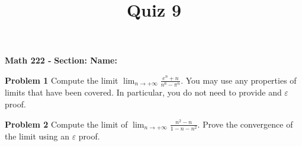 \documentclass{article}
\title{Quiz 9}
\begin{document}
\begin{center}\makeatletter %
{ \bf Math 222 - \@title }
{ \bf \hfill Section: \underline{\hspace{2cm}} \hfill Name: \underline{\hspace{5cm}} }
\end{center}

{\bf Problem 1} \quad Compute the limit $\displaystyle \lim_{n \to +\infty} \frac{e^n + n}{n^6 - \pi^n}$.
You may use any properties of limits that have been covered.  In particular, you do not need to provide
and $\varepsilon$ proof.\vfill

{\bf Problem 2} Compute the limit of $\displaystyle \lim_{n \to +\infty} \frac{n^2 - n}{1 - n - n^2}$.  Prove the convergence of the limit using an $\varepsilon$ proof.\vfill
\end{document}
